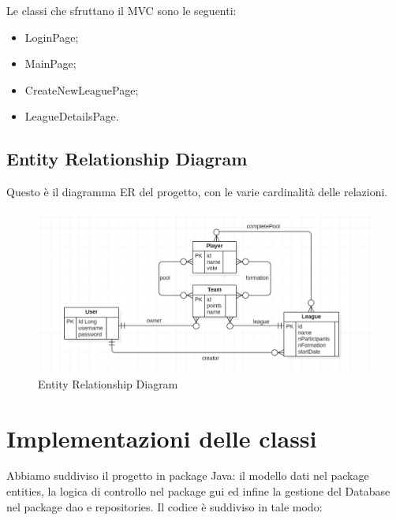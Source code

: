 \documentclass[twoside,openright,titlepage,fleqn,headinclude,12pt,a4paper,BCOR=5mm,footinclude]{scrbook}
\begin{document}
Le classi che sfruttano il MVC sono le seguenti:

\begin{itemize}

    \item LoginPage;
    \item MainPage;
    \item CreateNewLeaguePage;
    \item LeagueDetailsPage.

\end{itemize}

\section{Entity Relationship Diagram}
Questo è il diagramma ER del progetto, con le varie cardinalità delle relazioni.

\begin{figure}[H]
  \centering
  \includegraphics[width=\linewidth]{images/erDia.png}
  \caption{Entity Relationship Diagram}
  \label{fig:ER Diagram}
\end{figure}

\chapter{Implementazioni delle classi}
Abbiamo suddiviso il progetto in package Java: il modello dati nel package entities, la logica
di controllo nel package gui ed infine la gestione del Database nel package dao e repositories.
Il codice è suddiviso in tale modo:
\end{document}

